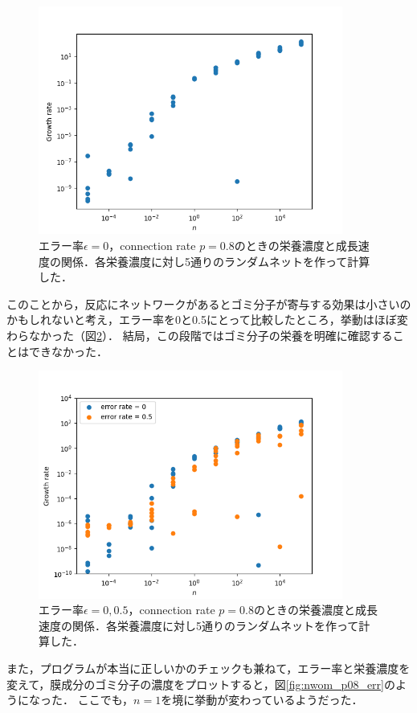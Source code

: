 \documentclass[a4paper,11pt]{jsarticle}
\begin{document}
\begin{figure}[htbp]
  \centering
  \includegraphics[width=10cm]{waste_N5_T5_p08_err0.png}
  \caption{エラー率$\epsilon=0$，connection rate $p=0.8$のときの栄養濃度と成長速度の関係．各栄養濃度に対し5通りのランダムネットを作って計算した．}
  \label{fig:ng_p08_err0}
\end{figure}

このことから，反応にネットワークがあるとゴミ分子が寄与する効果は小さいのかもしれないと考え，エラー率を0と0.5にとって比較したところ，挙動はほぼ変わらなかった（図\ref{fig:ng_p08_err0-05}）．
結局，この段階ではゴミ分子の栄養を明確に確認することはできなかった．

\begin{figure}[htbp]
  \centering
  \includegraphics[width=10cm]{waste_N5_T5_p08_err.png}
  \caption{エラー率$\epsilon=0,0.5$，connection rate $p=0.8$のときの栄養濃度と成長速度の関係．各栄養濃度に対し5通りのランダムネットを作って計算した．}
  \label{fig:ng_p08_err0-05}
\end{figure}

また，プログラムが本当に正しいかのチェックも兼ねて，エラー率と栄養濃度を変えて，膜成分のゴミ分子の濃度をプロットすると，図\ref{fig:nwom_p08_err}のようになった．
ここでも，$n=1$を境に挙動が変わっているようだった．
\end{document}
